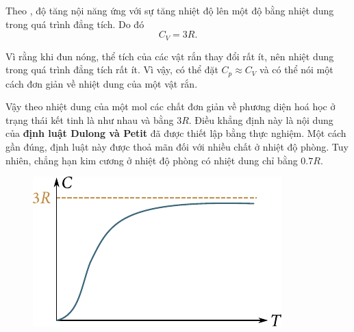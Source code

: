 
Theo , độ tăng nội năng ứng với sự tăng nhiệt độ lên một độ bằng nhiệt dung trong quá trình đẳng tích. Do đó
\begin{equation}\label{eq:13_1}
	C_V = 3R.
\end{equation}

\noindent


Vì rằng khi đun nóng, thể tích của các vật rắn thay đổi rất ít, nên nhiệt dung trong quá trình đẳng tích rất ít. Vì vậy, có thể đặt $C_p\approx C_V$ và có thể nói một cách đơn giản về nhiệt dung của một vật rắn.


Vậy theo  nhiệt dung của một mol các chất đơn giản về phương diện hoá học ở trạng thái kết tinh là như nhau và bằng $3R$. Điều khẳng định này là nội dung của \textbf{định luật Dulong và Petit} đã được thiết lập bằng thực nghiệm. Một cách gần đúng, định luật này được thoả mãn đối với nhiều chất ở nhiệt độ phòng. Tuy nhiên, chẳng hạn kim cương ở nhiệt độ phòng có nhiệt dung chỉ bằng $0.7R$.

\begin{figure}[!htb]
	\begin{center}
		\includegraphics[scale=1.0]{figures/ch_13/fig_13_11.pdf}
		\caption[]{}
		\label{fig:13_11}
	\end{center}
	\vspace{-0.8cm}
\end{figure}

